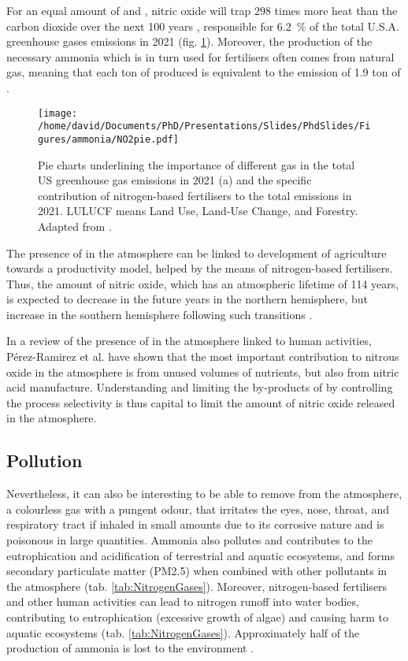 For an equal amount of  and , nitric oxide will trap 298 times more heat than the carbon dioxide over the next 100 years \parencite{MITCLIMATE}, responsible for \qty{6.2}{\percent} of the total U.S.A. greenhouse gases emissions in 2021 (fig. \ref{fig:PieGreenhouseNO2}).
Moreover, the production of the necessary ammonia which is in turn used for fertilisers often comes from natural gas, meaning that each ton of  produced is equivalent to the emission of 1.9 ton of  \parencite{Rafiqul2005, Chen2018}.

\begin{figure}[!htb]
    \centering
    \texttt{[image: /home/david/Documents/PhD/Presentations/Slides/PhdSlides/Figures/ammonia/NO2pie.pdf]}
    \caption{
    Pie charts underlining the importance of different gas in the total US greenhouse gas emissions in 2021 (a) and the specific contribution of nitrogen-based fertilisers to the total  emissions in 2021.
    LULUCF means Land Use, Land-Use Change, and Forestry.
    Adapted from \cite{EPAGreenhouseGases}.
    }
    \label{fig:PieGreenhouseNO2}
\end{figure}

The presence of  in the atmosphere can be linked to development of agriculture towards a productivity model, helped by the means of nitrogen-based fertilisers.
Thus, the amount of nitric oxide, which has an atmospheric lifetime of 114 years, is expected to decrease in the future years in the northern hemisphere, but increase in the southern hemisphere following such transitions \parencite{Solomon2007, Davidson2009}.

In a review of the presence of  in the atmosphere linked to human activities, Pérez-Ramirez et al. \parencite*{PerezRamirez2003} have shown that the most important contribution to nitrous oxide in the atmosphere is from unused volumes of nutrients, but also from nitric acid manufacture.
Understanding and limiting the by-products of  by controlling the process selectivity is thus capital to limit the amount of nitric oxide released in the atmosphere.

\subsection{Pollution}

Nevertheless, it can also be interesting to be able to remove  from the atmosphere, a colourless gas with a pungent odour, that irritates the eyes, nose, throat, and respiratory tract if inhaled in small amounts due to its corrosive nature and is poisonous in large quantities.
Ammonia also pollutes and contributes to the eutrophication and acidification of terrestrial and aquatic ecosystems, and forms secondary particulate matter (PM2.5) when combined with other pollutants in the atmosphere (tab. \ref{tab:NitrogenGases}).
Moreover, nitrogen-based fertilisers and other human activities can lead to nitrogen runoff into water bodies, contributing to eutrophication (excessive growth of algae) and causing harm to aquatic ecosystems (tab. \ref{tab:NitrogenGases}).
Approximately half of the production of ammonia is lost to the environment \parencite{Erisman2007}.

